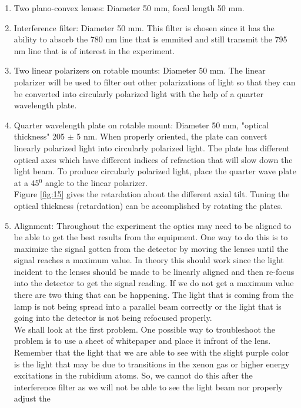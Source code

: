 \documentclass[twocolumn]{article}
\begin{document}
\begin{enumerate}[label=\alph*).]
\item Two plano-convex lenses: Diameter 50 mm, focal length 50 mm.
\item Interference filter: Diameter 50 mm. This filter is chosen since it has 
the ability to absorb the 780 nm line that is emmited and still transmit the 
795 nm line that is of interest in the experiment.
\item Two linear polarizers on rotable mounts: Diameter 50 mm. The linear 
polarizer will be used to filter out other polarizations of light so that they 
can be converted into circularly polarized light with the help of a quarter 
wavelength plate.
\item Quarter wavelength plate on rotable mount: Diameter 50 mm, "optical 
thickness" 205 $\pm$ 5 nm. When properly oriented, the plate can convert 
linearly polarized light into circularly polarized light. The plate has 
different optical axes which have different indices of refraction that will 
slow down the light beam. To produce circularly polarized light, place the 
quarter wave plate at a 45$^0$ angle to the linear polarizer.
\\
Figure \ref{fig:15} gives the retardation about the different axial tilt. 
Tuning the optical thickness (retardation) can be accomplished by rotating the 
plates.
\item Alignment: Throughout the experiment the optics may need to be aligned to 
be able to get the best results from the equipment. One way to do this is to 
maximize the signal gotten from the detector by moving the lenses until the 
signal reaches a maximum value. In theory this should work since the light 
incident to the lenses should be made to be linearly aligned and then re-focus 
into the detector to get the signal reading. If we do not get a maximum value 
there are two thing that can be happening. The light that is coming from the 
lamp is not being spread into a parallel beam correctly or the light that is 
going into the detector is not being refocused properly.
\\
We shall look at the first problem. One possible way to troubleshoot the 
problem is to use a sheet of whitepaper and place it infront of the lens. 
Remember that the light that we are able to see with the slight purple color 
is the light that may be due to transitions in the xenon gas or higher energy 
excitations in the rubidium atoms. So, we cannot do this after the interference 
filter as we will not be able to see the light beam nor properly adjust the 

\end{enumerate}
\end{document}

